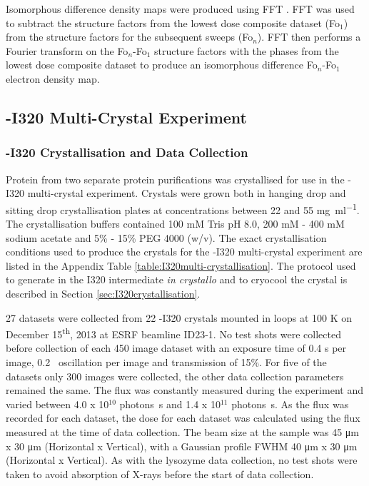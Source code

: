 Isomorphous difference density maps were produced using FFT \cite{Ten1973}. FFT was used to subtract the structure factors from the lowest dose composite dataset (Fo$_1$) from the structure factors for the subsequent sweeps (Fo$_n$). FFT then performs a Fourier transform on the Fo$_n$-Fo$_1$ structure factors with the phases from the lowest dose composite dataset to produce an isomorphous difference Fo$_n$-Fo$_1$ electron density map.    


\subsection{\atpdx -I320 Multi-Crystal Experiment}
\subsubsection*{\atpdx -I320 Crystallisation and Data Collection}	
Protein from two separate protein purifications was crystallised for use in the \atpdx -I320 multi-crystal experiment. Crystals were grown both in hanging drop and sitting drop crystallisation plates at concentrations between 22 \mgml and 55 \si{\milli\gram\per\milli\litre}. The crystallisation buffers contained 100 mM Tris pH 8.0, 200 mM - 400 mM sodium acetate and 5\% - 15\% PEG 4000 (w/v).
The exact crystallisation conditions used to produce the crystals for the \atpdx -I320 multi-crystal experiment are listed in the Appendix Table \ref{table:I320multi-crystallisation}. The protocol used to generate in the I320 intermediate \textit{in crystallo} and to cryocool the crystal is described in Section \ref{sec:I320crystallisation}.  
 

27 datasets were collected from 22 \atpdx -I320 crystals mounted in loops at 100 \si{\kelvin} on December 15\textsuperscript{th}, 2013 at ESRF beamline ID23-1. No test shots were collected before collection of each 450 image dataset with an exposure time of 0.4 \si{\second} per image, 0.2\degree~ oscillation per image and transmission of 15\%. For five of the datasets only 300 images were collected, the other data collection parameters remained the same. The flux was constantly measured during the experiment and varied between 4.0 x 10$^{10}$ photons\si{\per\second} and 1.4 x 10$^{11}$ photons\si{\per\second}. As the flux was recorded for each dataset, the dose for each dataset was calculated using the flux measured at the time of data collection. The beam size at the sample was 45 \si{\micro\metre} x 30 \si{\micro\metre} (Horizontal x Vertical), with a Gaussian profile FWHM 40 \si{\micro\metre} x 30 \si{\micro\metre} (Horizontal x Vertical). As with the lysozyme data collection, no test shots were taken to avoid absorption of X-rays before the start of data collection.

